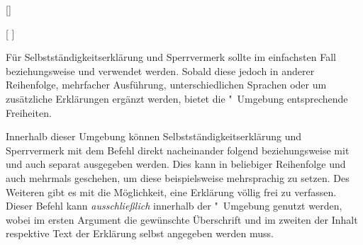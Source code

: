 \begin{Declaration*}{}
\begin{Declaration*}{}
\begin{Declaration*}{}
\begin{Declaration}{[]}
\begin{Declaration}{%
  [%
  ]%
}
\begin{Declaration}{}
\begin{Declaration}{}
\begin{Declaration}{%
}
\begin{Declaration}{%
}
\begin{Declaration}{}
\begin{Declaration}{%
}
\begin{Declaration}{}
\begin{Declaration}{}
\begin{Declaration}{}
\printdeclarationlist%
%
Für Selbstständigkeitserklärung und Sperrvermerk sollte im einfachsten Fall 
 beziehungsweise  und  
verwendet werden. Sobald diese jedoch in anderer Reihenfolge, mehrfacher 
Ausführung, unterschiedlichen Sprachen oder um zusätzliche Erklärungen ergänzt 
werden, bietet die "~Umgebung entsprechende 
Freiheiten.

Innerhalb dieser Umgebung können Selbstständigkeitserklärung und Sperrvermerk 
mit dem Befehl  direkt nacheinander folgend beziehungsweise 
mit  und  auch separat ausgegeben werden. 
Dies kann in beliebiger Reihenfolge und auch mehrmals geschehen, um diese 
beispielsweise mehrsprachig zu setzen.
 Des Weiteren gibt es mit  die 
Möglichkeit, eine Erklärung völlig frei zu verfassen. Dieser Befehl kann 
\emph{ausschließlich} innerhalb der "~Umgebung 
genutzt werden, wobei im ersten Argument die gewünschte Überschrift und im 
zweiten der Inhalt respektive Text der Erklärung selbst angegeben werden muss.


\end{Declaration}
\end{Declaration}
\end{Declaration}
\end{Declaration}
\end{Declaration}
\end{Declaration}
\end{Declaration}
\end{Declaration}
\end{Declaration}
\end{Declaration}
\end{Declaration}
\end{Declaration*}
\end{Declaration*}
\end{Declaration*}

